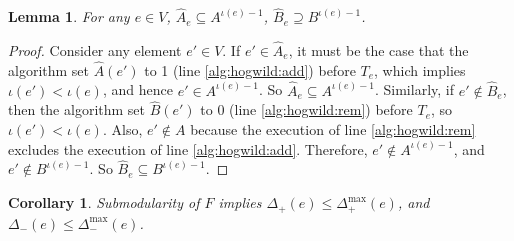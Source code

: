 \documentclass{article} %
\newtheorem{cor}[thm]{Corollary}
\newtheorem{lem}[thm]{Lemma}
\begin{document}
\begin{lem}\label{lem:set_bound} For any $e\in V$, $\hat{A}_e \subseteq A^{\iota(e)-1}$, $\hat{B}_e \supseteq B^{\iota(e)-1}$.
\end{lem}
\begin{proof}
Consider any element $e'\in V$.
If $e'\in \hat{A}_e$, it must be the case that the algorithm set $\hat{A}(e')$ to 1 (line \ref{alg:hogwild:add}) before $T_e$, which implies $\iota(e') < \iota(e)$, and hence $e' \in A^{\iota(e)-1}$.
So $\hat{A}_e \subseteq A^{\iota(e)-1}$.
Similarly, if $e'\not\in \hat{B}_e$, then the algorithm set $\hat{B}(e')$ to 0 (line \ref{alg:hogwild:rem}) before $T_e$, so $\iota(e') < \iota(e)$.
Also, $e'\not\in A$ because the execution of line \ref{alg:hogwild:rem} excludes the execution of line \ref{alg:hogwild:add}.
Therefore, $e'\not\in A^{\iota(e)-1}$, and $e'\not\in B^{\iota(e)-1}$.
So $\hat{B}_e \subseteq B^{\iota(e)-1}$.
\end{proof}

\begin{cor}\label{cor:delta_bound}
Submodularity of $F$ implies
$\Delta_{+}(e) \leq \Delta_{+}^{\max}(e)$, and
$\Delta_{-}(e) \leq \Delta_{-}^{\max}(e)$.
\end{cor}
\end{document}
